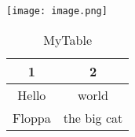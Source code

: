 \documentclass{article}
\begin{document}
	\texttt{[image: image.png]}
	\begin{table}[h!]
		\centering
		\caption{MyTable}
		\begin{tabular}{|c|c|}
			\hline
			1 & 2 \\ \hline 
			Hello & world \\ \hline 
			Floppa & the big cat \\ \hline 
		\end{tabular}
	\end{table}
\end{document}
